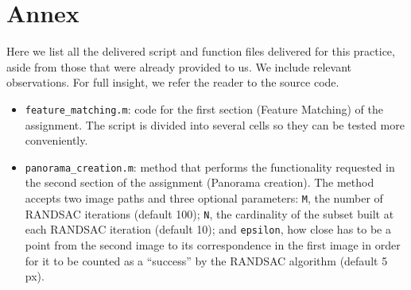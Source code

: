 \section{Annex}

Here we list all the delivered script and function files delivered for this practice,
aside from those that were already provided to us.
We include relevant observations. For full insight, we refer the reader to the
source code.

\begin{itemize}
	\item \texttt{feature\_matching.m}: code for the first section (Feature Matching) of
	the assignment. The script is divided into several cells so they can be tested
	more conveniently.
	\item \texttt{panorama\_creation.m}: method that performs the functionality requested
	in the second section of the assignment (Panorama creation). The method accepts
	two image paths and three optional parameters: \texttt{M}, the number of
	RANDSAC iterations (default 100); \texttt{N}, the cardinality of the subset built at each
	RANDSAC iteration (default 10); and \texttt{epsilon}, how close has to be a point from the
	second image to its correspondence in the first image in order for it to be counted
	as a ``success'' by the RANDSAC algorithm (default 5 px).
\end{itemize}
